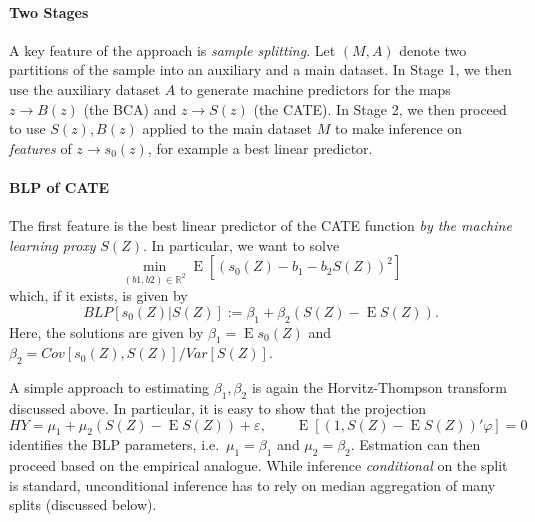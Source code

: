 \documentclass[11pt, a4paper, leqno]{article}
\DeclareMathOperator{\E}{E}
\begin{document}
\paragraph*{Two Stages}
A key feature of the approach is \textit{sample splitting}. Let $(M,A)$ denote two partitions of the sample into an auxiliary and a main dataset.
In Stage 1, we then use the auxiliary dataset $A$ to generate machine predictors for the maps $z\to B(z)$ (the BCA) and $z\to S(z)$ (the CATE).
In Stage 2, we then proceed to use $S(z), B(z)$ applied to the main dataset $M$ to make inference on \textit{features} of $z\to s_0(z)$, for example a best linear predictor.

\paragraph*{BLP of CATE}
The first feature is the best linear predictor of the CATE function \textit{by the machine learning proxy} $S(Z)$.
In particular, we want to solve
\begin{equation*}
    \min_{(b1,b2)\in \mathbb{R}^2} \E [(s_0(Z) - b_1 - b_2 S(Z))^2]
\end{equation*}
which, if it exists, is given by
\begin{equation*}
    BLP[s_0(Z)|S(Z)] := \beta_1 + \beta_2(S(Z) - \E S(Z)).
\end{equation*}
Here, the solutions are given by $\beta_1 = \E s_0(Z)$ and $\beta_2 = Cov[s_0(Z), S(Z)]/Var[S(Z)]$.

A simple approach to estimating $\beta_1, \beta_2$ is again the Horvitz-Thompson transform discussed above.
In particular, it is easy to show that the projection
\begin{equation*}
    HY = \mu_1 + \mu_2(S(Z) - \E S(Z)) + \varepsilon, \qquad \E[(1, S(Z) - \E S(Z))'\varphi] = 0
\end{equation*}
identifies the BLP parameters, i.e.\ $\mu_1=\beta_1$ and $\mu_2 = \beta_2$.
Estmation can then proceed based on the empirical analogue.
While inference \textit{conditional} on the split is standard, unconditional inference has to rely on median aggregation of many splits (discussed below).
\end{document}

